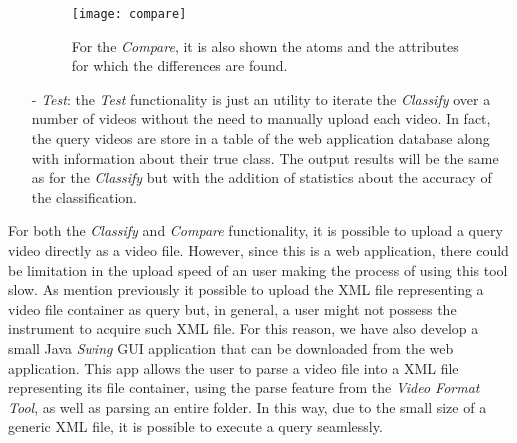 \begin{itemize}
\begin{figure}
  \centering
  \texttt{[image: compare]}
  \caption{For the \emph{Compare}, it is also shown the atoms and the attributes for which the differences are found.}\label{fig:compare}
\end{figure}

\item[-] \emph{Test}: the \emph{Test} functionality is just an utility to iterate the \emph{Classify} over a number of videos without the need to manually upload each video. In fact, the query videos are store in a table of the web application database along with information about their true class. The output results will be the same as for the \emph{Classify} but with the addition of statistics about the accuracy of the classification.

\end{itemize}

For both the \emph{Classify} and \emph{Compare} functionality, it is possible to upload a query video directly as a video file. However, since this is a web application, there could be limitation in the upload speed of an user making the process of using this tool slow. As mention previously it possible to upload the XML file representing a video file container as query but, in general, a user might not possess the instrument to acquire such XML file. For this reason, we have also develop a small Java \emph{Swing} GUI application that can be downloaded from the web application. This app allows the user to parse a video file into a XML file representing its file container, using the parse feature from the \emph{Video Format Tool}, as well as parsing an entire folder. In this way, due to the small size of a generic XML file, it is possible to execute a query seamlessly.
